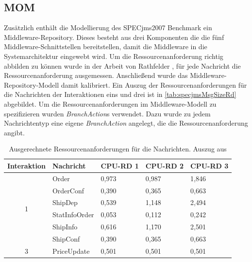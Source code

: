 \subsection{MOM}
Zusätzlich enthält die Modellierung des SPECjms2007 Benchmark ein Middleware-Repository. Dieses besteht aus drei Komponenten die die fünf Middleware-Schnittstellen bereitstellen, damit die Middleware in die Systemarchitektur eingewebt wird. Um die Ressourcenanforderung richtig abbilden zu können wurde in der Arbeit von Rathfelder \cite{Rathfelder2013}, für jede Nachricht die Ressourcenanforderung ausgemessen. Anschließend wurde das Middleware-Repository-Modell damit kalibriert. Ein Auszug der Ressourcenanforderungen für die Nachrichten der Interaktionen eins und drei ist in \autoref{tab:specjmsMsgSizeRd} abgebildet. Um die Ressourcenanforderungen im Middleware-Modell zu spezifizieren wurden \emph{BranchAction}s verwendet. Dazu wurde zu jedem Nachrichtentyp eine eigene \emph{BranchAction} angelegt, die die Ressourcenanforderung angibt. 

\begin{table}
\center
  \begin{tabular}{|c|l|l|l|l|}
  \hline
    \textbf{Interaktion} & \textbf{Nachricht} & \textbf{CPU-RD 1} & \textbf{CPU-RD 2} &\textbf{CPU-RD 3} \\
    \hline \hline
    \multirow{6}{*}{1} & Order & 0,973 & 0,987 & 1,846 \\\cline{2-5}
    & OrderConf & 0,390 & 0,365 & 0,663 \\\cline{2-5}
    & ShipDep & 0,539 & 1,148 & 2,494\\\cline{2-5}
    & StatInfoOrder & 0,053 & 0,112 & 0,242 \\\cline{2-5}
    & ShipInfo & 0,616 & 1,170 & 2,501 \\\cline{2-5}
    & ShipConf & 0,390 & 0,365 & 0,663  \\\hline
    \hline
     3 & PriceUpdate & 0,501 & 0,501 & 0,501 \\\hline
  \end{tabular}
	\caption{\label{tab:specjmsMsgSizeRd} Ausgerechnete Ressourcenanforderungen für die Nachrichten. Auszug aus \cite{Rathfelder2013}}
\end{table}



